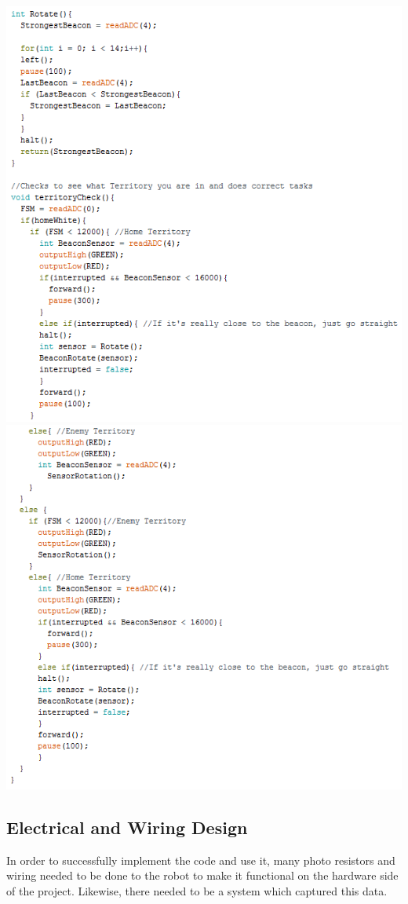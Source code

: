\documentclass{article}
\begin{document}
\begin{center}
\includegraphics[]{FullCode5.png}
\includegraphics[]{FullCode6.png}
\end{center}
    
\subsection{Electrical and Wiring Design}
    In order to successfully implement the code and use it, many photo resistors and wiring needed to be done to the robot to make it functional on the hardware side of the project. Likewise, there needed to be a system which captured this data.
    
\end{document}

